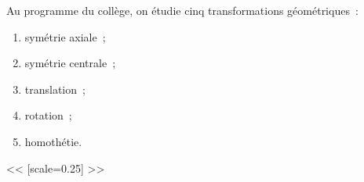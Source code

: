 \documentclass{thecours}
\begin{document}
    Au programme du collège, on étudie cinq transformations géométriques~:
    \begin{enumerate}
        \item symétrie axiale~;
        \item symétrie centrale~;
        \item translation~;
        \item rotation~;
        \item homothétie.
    \end{enumerate}
    \exported[scale=1.5,lmargin=30,vmargins=30]%
                <<
        \gifactivatedtrue
        [scale=0.25]
    >>
\end{document}
